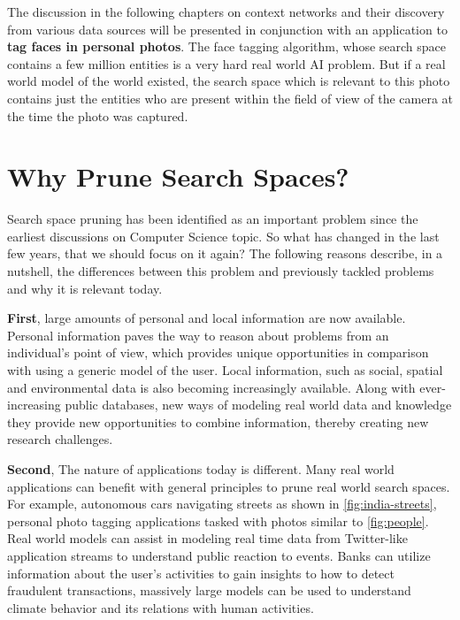 The discussion in the following chapters on context networks and their discovery from various data sources will be presented in conjunction with an application to \textbf{tag faces in personal photos}. The face tagging algorithm, whose search space contains a few million entities is a very hard real world AI problem. But if a real world model of the world existed, the search space which is relevant to this photo contains just the entities who are present within the field of view of the camera at the time the photo was captured. 

\section{Why Prune Search Spaces?}
Search space pruning has been identified as an important problem since the earliest discussions on Computer Science topic. So what has changed in the last few years, that we should focus on it again? The following reasons describe, in a nutshell, the differences between this problem and previously tackled problems and why it is relevant today.


\textbf{First}, large amounts of personal and local information are now available. Personal information paves the way to reason about problems from an individual's point of view, which provides unique opportunities in comparison with using a generic model of the user. Local information, such as social, spatial and environmental data is also becoming increasingly available. Along with ever-increasing public databases, new ways of modeling real world data \cite{gupta2011managing} and knowledge \cite{mcguinness2004owl} they provide new opportunities to combine information, thereby creating new research challenges.

\textbf{Second}, The nature of applications today is different. Many real world applications can benefit with general principles to prune real world search spaces. For example, autonomous cars navigating streets as shown in \ref{fig:india-streets}, personal photo tagging applications tasked with photos similar to \ref{fig:people}. Real world models can assist in modeling real time data from Twitter-like application streams to understand public reaction to events. Banks can utilize information about the user's activities to gain insights to how to detect fraudulent transactions, massively large models can be used to understand climate behavior and its relations with human activities.

